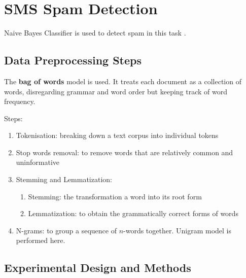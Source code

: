 \section{SMS Spam Detection}

Naive Bayes Classifier is used to detect spam in this task \cite{raschka2014naive}.

\subsection{Data Preprocessing Steps}

The \textbf{bag of words} model is used. 
It treats each document as a collection of words, disregarding grammar and word order but keeping track of word frequency.

Steps:
\begin{enumerate}
    \item Tokenisation: breaking down a text corpus into individual tokens
    \item Stop words removal: to remove words that are relatively common and uninformative
    \item Stemming and Lemmatization: 
    \begin{enumerate}
        \item Stemming: the transformation a word into its root form
        \item Lemmatization: to obtain the grammatically correct forms of words
    \end{enumerate}
    \item N-grams: to group a sequence of $n$-words together. Unigram model is performed here.
\end{enumerate}




\subsection{Experimental Design and Methods}

